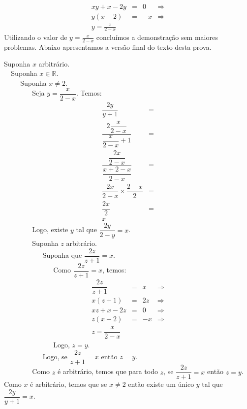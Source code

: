 \begin{Example}
\[\begin{array}{lclc}
xy + x - 2y & = & 0 & \Rightarrow \\
y(x - 2) & = & -x & \Rightarrow \\
y = \frac{x}{2 - x}
\end{array}
\]
Utilizando o valor de $y = \frac{x}{2 - x}$ concluímos a demonstração
sem maiores problemas. Abaixo apresentamos a versão final do texto
desta prova.
\begin{flushleft}
Suponha $x$ arbitrário.\\
\verb|  |Suponha $x\in\mathbb{R}$.\\
\verb|    | Suponha $x\neq 2$.\\
\verb|        |Seja $y = \dfrac{x}{2 - x}$. Temos:\\
\[
\begin{array}{lc}
\dfrac{2y}{y+1} & =\\
\dfrac{2\dfrac{x}{2 - x}}{\dfrac{x}{2 - x} + 1} & = \\
\dfrac{\dfrac{2x}{2- x}}{\dfrac{x + 2 - x}{2 - x}} & = \\
\dfrac{2x}{2 - x}\times\dfrac{2 - x}{2} & = \\
\dfrac{2x}{2} & = \\
x
\end{array}
\]
\verb|        |Logo, existe $y$ tal que $\dfrac{2y}{2- y} = x$.\\
\verb|        |Suponha $z$ arbitrário.\\
\verb|           |Suponha que $\dfrac{2z}{z + 1} = x$.\\
\verb|              |Como $\dfrac{2z}{z + 1} = x$, temos:\\
\[
\begin{array}{lclc}
\dfrac{2z}{z + 1} & = & x & \Rightarrow\\
x(z + 1) & = & 2z & \Rightarrow\\
xz + x - 2z & = & 0 & \Rightarrow \\
z(x - 2) & = & -x & \Rightarrow \\
z = \dfrac{x}{2 - x}
\end{array}
\]
\verb|              |Logo, $z = y$.\\
\verb|           |Logo, se $\dfrac{2z}{z + 1} = x$ então $z = y$.\\
\verb|        |Como $z$ é arbitrário, temos que para todo $z$, se $\dfrac{2z}{z + 1} = x$ então $z = y$.\\
Como $x$ é arbitrário, temos que se $x\neq 2$ então existe um único
$y$ tal que $\dfrac{2y}{y+1} = x$.
\end{flushleft}
\end{Example}

